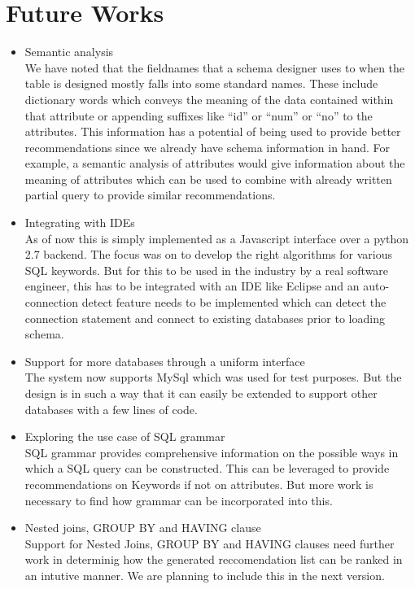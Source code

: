 \documentclass{acm_proc_article-sp}
\begin{document}
\section{Future Works}
\begin{itemize}
\item Semantic analysis \\
We have noted that the fieldnames that a schema designer uses to when the table is designed mostly falls into some standard names. These include dictionary words which conveys the meaning of the data contained within that attribute or appending suffixes like ``id'' or ``num'' or ``no'' to the attributes. This information has a potential of being used to provide better recommendations since we already have schema information in hand. For example, a semantic analysis of attributes would give information about the meaning of attributes which can be used to combine with already written partial query to provide similar recommendations.  

\item Integrating with IDEs\\
As of now this is simply implemented as a Javascript interface over a python 2.7 backend. The focus was on to develop the right algorithms for various SQL keywords. But for this to be used in the industry by a real software engineer, this has to be integrated with an IDE like Eclipse and an auto-connection detect feature needs to be implemented which can detect the connection statement and connect to existing databases prior to loading schema. 

\item Support for more databases through a uniform interface \\
The system now supports MySql which was used for test purposes. But the design is in such a way that it can easily be extended to support other databases with a few lines of code. 

\item Exploring the use case of SQL grammar\\
SQL grammar provides comprehensive information on the possible ways in which a SQL query can be constructed. This can be leveraged to provide recommendations on Keywords if not on attributes.  But more work is necessary to find how grammar can be incorporated into this. 

\item Nested joins, GROUP BY and HAVING clause\\
Support for Nested Joins, GROUP BY and HAVING clauses need further work in determinig how the generated reccomendation list can be ranked in an intutive manner. We are planning to include this in the next version. 

\end{itemize}
\end{document}
